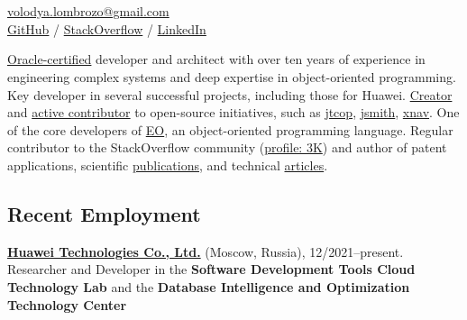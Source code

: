 \documentclass{vl}
\begin{document}
    \vlPrintPhoto{}

    \section*{\Large {}}

    \href{mailto:volodya.lombrozo@gmail.com}{volodya.lombrozo@gmail.com}\\%
    \href{https://github.com/volodya-lombrozo}{GitHub} /
    \href{https://stackoverflow.com/users/10423604/volodya-lombrozo}{StackOverflow} /
    \href{https://www.linkedin.com/in/vladimir-zakharov-lombrozo-b71744216/}{LinkedIn}

    \vspace*{12pt}

    \href{https://catalog-education.oracle.com/pls/certview/sharebadge?id=87F6A2FE819A5A5AF4120A05900AB28A461EE9A3EE9FBFA02721FADAEB3BCE19}{Oracle-certified}
    developer and architect with over ten years of experience in engineering complex systems
    and deep expertise in object-oriented programming.
    Key developer in several successful projects, including those for Huawei.
    \href{https://github.com/volodya-lombrozo?tab=repositories}{Creator} and
    \href{https://github.com/volodya-lombrozo}{active contributor} to open-source initiatives, such as
    \href{https://github.com/volodya-lombrozo/jtcop}{jtcop},
    \href{https://github.com/volodya-lombrozo/jsmith}{jsmith},
    \href{https://github.com/volodya-lombrozo/xnav}{xnav}.
    One of the core developers of \href{https://www.eolang.org}{EO}, an object-oriented programming language.
    Regular contributor to the StackOverflow community
    (\href{https://stackoverflow.com/users/10423604/volodya-lombrozo}{profile: 3K}) and
    author of patent applications, scientific \href{https://arxiv.org/abs/2410.05631}{publications}, and technical
    \href{https://dzone.com/users/4993224/volodya-lombrozo.html}{articles}.

    \subsection*{Recent Employment}

    \textbf{\href{https://www.huawei.com}{Huawei Technologies Co., Ltd.}} (Moscow, Russia), 12/2021--present.
    Researcher and Developer in the \textbf{Software Development Tools Cloud Technology Lab} and the
    \textbf{Database Intelligence and Optimization Technology Center}
\end{document}
